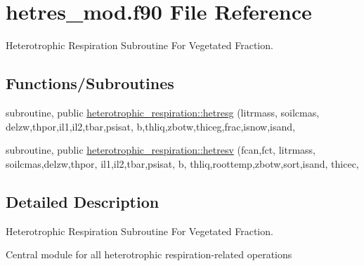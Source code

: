 \hypertarget{hetres__mod_8f90}{}\section{hetres\+\_\+mod.\+f90 File Reference}
\label{hetres__mod_8f90}


Heterotrophic Respiration Subroutine For Vegetated Fraction.  


\subsection*{Functions/\+Subroutines}
{\bf }\par
\begin{DoxyCompactItemize}
\item 
subroutine, public \hyperlink{group__hetresg_gaf35383e36392dff7ca33ff9022cb70c0}{heterotrophic\+\_\+respiration\+::hetresg} (litrmass, soilcmas, delzw,thpor,il1,il2,tbar,psisat, b,thliq,zbotw,thiceg,frac,isnow,isand,
\end{DoxyCompactItemize}

{\bf }\par
\begin{DoxyCompactItemize}
\item 
subroutine, public \hyperlink{group__hetresv_gade89f5ca2bd95e6c11fec66213369fd2}{heterotrophic\+\_\+respiration\+::hetresv} (fcan,fct, litrmass, soilcmas,delzw,thpor, il1,il2,tbar,psisat, b, thliq,roottemp,zbotw,sort,isand, thicec,
\end{DoxyCompactItemize}



\subsection{Detailed Description}
Heterotrophic Respiration Subroutine For Vegetated Fraction. 

Central module for all heterotrophic respiration-\/related operations 